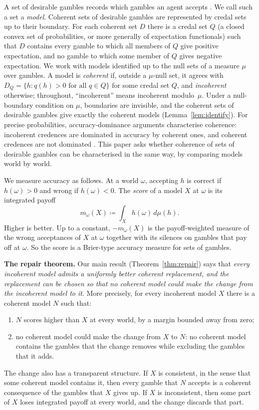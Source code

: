 \documentclass[11pt]{article}
\theoremstyle{plain}
\theoremstyle{definition}
\theoremstyle{remark}
\begin{document}
A set of desirable gambles records which gambles an agent accepts \cite{Walley,Quaeghebeur}.
We call such a set a \emph{model}. Coherent sets of desirable gambles are represented by
credal sets up to their boundary. For each coherent set $D$ there is a credal set $Q$ (a
closed convex set of probabilities, or more generally of expectation functionals) such that
$D$ contains every gamble to which all members of $Q$ give positive expectation, and no gamble
to which some member of $Q$ gives negative expectation. We work with models identified up to
the null sets of a measure $\mu$ over gambles. A model is \emph{coherent} if, outside a
$\mu$-null set, it agrees with $D_Q=\{h:q(h)>0\text{ for all }q\in Q\}$ for some credal set
$Q$, and \emph{incoherent} otherwise; throughout, ``incoherent'' means incoherent
modulo~$\mu$. Under a null-boundary condition on $\mu$, boundaries are invisible, and the
coherent sets of desirable gambles give exactly the coherent models
(Lemma~\ref{lem:identify}). For precise probabilities, accuracy-dominance
arguments characterise coherence: incoherent credences are dominated in accuracy by coherent
ones, and coherent credences are not dominated \cite{deFinetti,Joyce,Predd,Pettigrew}. This
paper asks whether coherence of sets of desirable gambles can be characterised in the same
way, by comparing models world by world.

We measure accuracy as follows. At a world $\omega$, accepting $h$ is correct if
$h(\omega)>0$ and wrong if $h(\omega)<0$. The \emph{score} of a model $X$ at $\omega$ is its
integrated payoff
\[
  m_\omega(X)\coloneqq\int_Xh(\omega)\,d\mu(h).
\]
Higher is better. Up to a constant, $-m_\omega(X)$ is the payoff-weighted measure of the
wrong acceptances of $X$ at $\omega$ together with its silences on gambles that pay off at
$\omega$. So the score is a Brier-type accuracy measure for sets of gambles.

\smallskip\noindent\textbf{The repair theorem.} Our main result (Theorem~\ref{thm:repair})
says that \emph{every incoherent model admits a uniformly better coherent replacement, and the
replacement can be chosen so that no coherent model could make the change from the incoherent
model to it}. More precisely, for every incoherent model $X$ there is a coherent model $N$ such
that:
\begin{enumerate}[label=(\roman*)]
  \item $N$ scores higher than $X$ at every world, by a margin bounded away from zero;
  \item no coherent model could make the change from $X$ to $N$: no coherent model contains
  the gambles that the change removes while excluding the gambles that it adds.
\end{enumerate}
The change also has a transparent structure. If $X$ is consistent, in the sense that some
coherent model contains it, then every gamble that $N$ accepts is a coherent consequence of
the gambles that $X$ gives up. If $X$ is inconsistent, then some part of $X$ loses integrated
payoff at every world, and the change discards that part.
\end{document}
